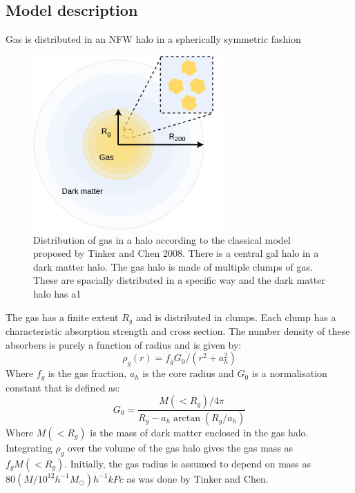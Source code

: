 \documentclass[12pt,a4paper,twoside]{book}
\begin{document}
	 	\subsection{Model description}
		 	Gas is distributed in an NFW halo in a spherically symmetric fashion
		 	\begin{figure}[h!]
		 		\centering
		 		\includegraphics[width=0.65\textwidth]{halo-model.png}
		 		\caption{Distribution of gas in a halo according to the classical model proposed by Tinker and Chen 2008. There is a central gal halo in a dark matter halo. The gas halo is made of multiple clumps of gas. These are spacially distributed in a specific way and the dark matter halo has a1}
		 		\label{fig:halo-model}
		 	\end{figure}
		 	The gas has a finite extent $R_g$ and is distributed in clumps. Each clump has a characteristic absorption strength and cross section. The number density of these absorbers is purely a function of radius and is given by:
		 	$$
		 	\rho_g(r)=f_gG_0/(r^2+a_h^2)
		 	$$
		 	Where $f_g$ is the gas fraction, $a_h$ is the core radius and $G_0$ is a normalisation constant that is defined as:
		 	$$
		 	G_0=\frac{M(<R_g)/4\pi}{R_g-a_h\arctan(R_g/a_h)}
		 	$$
		 	Where $M(<R_g)$ is the mass of dark matter enclosed in the gas halo. Integrating $\rho_g$ over the volume of the gas halo gives the gas mass as $f_gM(<R_g)$. Initially, the gas radius is assumed to depend on mass as $80(M/10^{12}h^{-1}M_\odot)h^{-1}kPc$ as was done by Tinker and Chen.
\end{document}
